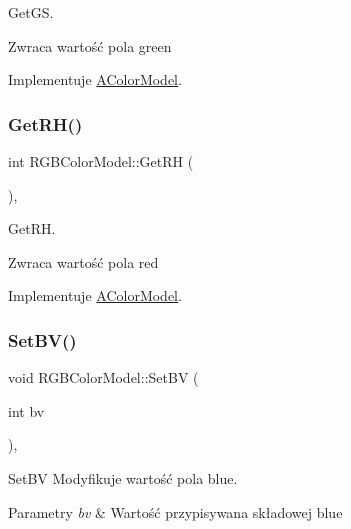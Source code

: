 Get\+GS. 

\begin{DoxyReturn}{Zwraca}
wartość pola green 
\end{DoxyReturn}


Implementuje \mbox{\hyperlink{class_a_color_model}{A\+Color\+Model}}.

\mbox{\label{class_r_g_b_color_model_afd8f53b2cd42f3563db714978445a324}} 
\subsubsection{\texorpdfstring{Get\+R\+H()}{GetRH()}}
{\footnotesize\ttfamily int R\+G\+B\+Color\+Model\+::\+Get\+RH (\begin{DoxyParamCaption}{ }\end{DoxyParamCaption})\hspace{0.3cm}{\ttfamily [override]}, {\ttfamily [virtual]}}



Get\+RH. 

\begin{DoxyReturn}{Zwraca}
wartość pola red 
\end{DoxyReturn}


Implementuje \mbox{\hyperlink{class_a_color_model}{A\+Color\+Model}}.

\mbox{\label{class_r_g_b_color_model_ad3fa9841c0fa4082e06a81a3bbf57988}} 
\subsubsection{\texorpdfstring{Set\+B\+V()}{SetBV()}}
{\footnotesize\ttfamily void R\+G\+B\+Color\+Model\+::\+Set\+BV (\begin{DoxyParamCaption}\item[{int}]{bv }\end{DoxyParamCaption})\hspace{0.3cm}{\ttfamily [override]}, {\ttfamily [virtual]}}



Set\+BV Modyfikuje wartość pola blue. 


\begin{DoxyParams}{Parametry}
{\em bv} & Wartość przypisywana składowej blue \\
\hline
\end{DoxyParams}


